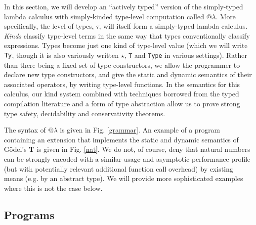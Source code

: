 In this section, we will develop an ``actively typed'' version of the simply-typed lambda calculus with simply-kinded type-level computation called @$\lambda$. More specifically, the level of types, $\tau$, will itself form a simply-typed lambda calculus. \emph{Kinds} classify type-level terms in the same way that types conventionally classify expressions. Types become just one kind  of type-level value (which we will write $\textsf{Ty}$, though it is also variously written $\star$, \verb|T| and \verb|Type| in various settings). Rather than there being a fixed set of type constructors, we allow the programmer to declare new type  constructors, and give the static and dynamic semantics of their associated operators, by writing type-level functions. In the semantics for this calculus, our kind system combined with techniques borrowed from the typed compilation literature and a form of type abstraction allow us to prove strong type safety, decidability and conservativity theorems.

The syntax of @$\lambda$ is given in Fig. \ref{grammar}. An example of a program containing an extension that implements the static and dynamic semantics of G\"odel's \textbf{T} is given in Fig. \ref{nat}. We do not, of course, deny that natural numbers can be strongly encoded with a similar usage and asymptotic performance profile (but with potentially relevant additional function call overhead) by existing means (e.g. by an abstract type). We will provide more sophisticated examples where this is not the case below. %

\subsection{Programs}

